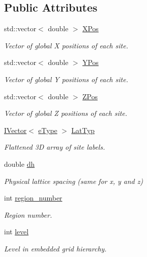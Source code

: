 \subsection*{Public Attributes}
\begin{DoxyCompactItemize}
\item 
std\+::vector$<$ double $>$ \hyperlink{class_grid_obj_af31df133bf9419da6222a0dbb4e54bab}{X\+Pos}
\begin{DoxyCompactList}\small\item\em Vector of global X positions of each site. \end{DoxyCompactList}\item 
std\+::vector$<$ double $>$ \hyperlink{class_grid_obj_a2bd4e9b575377b8e76e5ebe7a3a31194}{Y\+Pos}
\begin{DoxyCompactList}\small\item\em Vector of global Y positions of each site. \end{DoxyCompactList}\item 
std\+::vector$<$ double $>$ \hyperlink{class_grid_obj_af859d35bf0a03cee8965ce3e22e651c6}{Z\+Pos}
\begin{DoxyCompactList}\small\item\em Vector of global Z positions of each site. \end{DoxyCompactList}\item 
\hyperlink{class_i_vector}{I\+Vector}$<$ \hyperlink{_grid_obj_8h_a12f8ec8f0e7a4584b9fe481bb53fa60e}{e\+Type} $>$ \hyperlink{class_grid_obj_a8ce077fba648f767361039eb924c45ae}{Lat\+Typ}
\begin{DoxyCompactList}\small\item\em Flattened 3D array of site labels. \end{DoxyCompactList}\item 
double \hyperlink{class_grid_obj_a4efe4f79d600da2f459a0cc08b89b40c}{dh}
\begin{DoxyCompactList}\small\item\em Physical lattice spacing (same for x, y and z) \end{DoxyCompactList}\item 
int \hyperlink{class_grid_obj_ae0b724f2d977cfe38df2bb191e2fb042}{region\+\_\+number}
\begin{DoxyCompactList}\small\item\em Region number. \end{DoxyCompactList}\item 
int \hyperlink{class_grid_obj_a7dfedc4442a386ec15c8b03ca899c1a9}{level}
\begin{DoxyCompactList}\small\item\em Level in embedded grid hierarchy. \end{DoxyCompactList}\item 

\end{DoxyCompactItemize}
